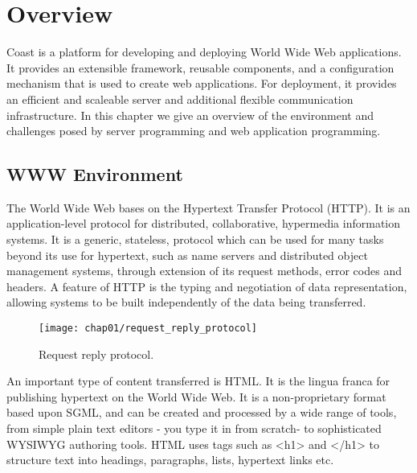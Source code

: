 \clearpage{}
\chapter{Overview}\label{Overview}
Coast is a platform for developing and deploying World Wide Web
applications. It provides an extensible framework, reusable
components, and a configuration mechanism that is used to create web
applications. For deployment, it provides an efficient and scaleable
server and additional flexible communication infrastructure.
In this chapter we give an overview of the environment and challenges
posed by server programming and web application programming.

\section{WWW Environment}
The World Wide Web bases on the Hypertext Transfer Protocol (HTTP). It
is an application-level protocol for distributed, collaborative,
hypermedia information systems. It is a generic, stateless, protocol
which can be used for many tasks beyond its use for hypertext, such as
name servers and distributed object management systems, through
extension of its request methods, error codes and headers. A feature
of HTTP is the typing and negotiation of data representation, allowing
systems to be built independently of the data being transferred. 

\begin{figure}[hbt]
  \centering
  \texttt{[image: chap01/request\_reply\_protocol]}
  \caption{Request reply protocol.}
  \label{fig:request_reply_protocol}
\end{figure}

An important type of content transferred is HTML. It is the lingua
franca for publishing hypertext on the World Wide Web. It is a
non-proprietary format based upon SGML, and can be created and
processed by a wide range of tools, from simple plain text editors -
you type it in from scratch- to sophisticated WYSIWYG authoring tools.
HTML uses tags such as <h1> and </h1> to structure text into headings,
paragraphs, lists, hypertext links etc. 



